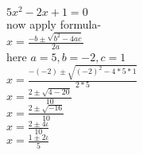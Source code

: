 \documentclass{report}
\begin{document}
$ 5x^2 -2x + 1=0 $ \\

now apply formula-\\

$ x=\frac{-b \pm \sqrt{b^2 -4ac}}{2a}$\\

here $a=5, b=-2, c=1$\\

$ x=\frac{-(-2) \pm \sqrt{(-2)^2 -4*5*1}}{2*5}$\\
$ x=\frac{2 \pm \sqrt{4-20}}{10}$\\
$ x=\frac{2 \pm \sqrt{-16}}{10}$\\
$ x=\frac{2 \pm 4\iota }{10}$\\
$ x=\frac{1 \pm 2\iota }{5}$\\
\end{document}

